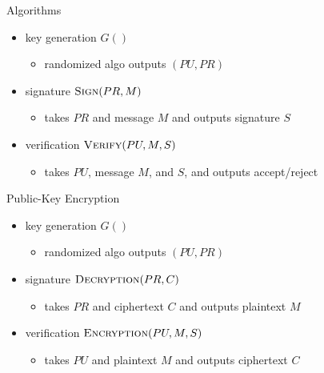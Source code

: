 \documentclass[draft]{article}
\begin{document}
\begin{multicols}{2}
    Algorithms
    \begin{itemize}[nosep]
        \item key generation $G()$
              \begin{itemize}[nosep]\item randomized algo outputs $(PU, PR)$\end{itemize}
        \item signature $\textproc{Sign}(PR, M)$
              \begin{itemize}[nosep]\item takes $PR$ and message $M$ and outputs signature $S$\end{itemize}
        \item verification $\textproc{Verify}(PU, M, S)$
              \begin{itemize}[nosep]\item takes $PU$, message $M$, and $S$, and outputs accept/reject\end{itemize}
    \end{itemize}
    Public-Key Encryption
    \begin{itemize}[nosep]
        \item key generation $G()$
              \begin{itemize}[nosep]\item randomized algo outputs $(PU, PR)$\end{itemize}
        \item signature $\textproc{Decryption}(PR, C)$
              \begin{itemize}[nosep]\item takes $PR$ and ciphertext $C$ and outputs plaintext $M$\end{itemize}
        \item verification $\textproc{Encryption}(PU, M, S)$
              \begin{itemize}[nosep]\item takes $PU$ and plaintext $M$ and outputs ciphertext $C$\end{itemize}
    \end{itemize}
\end{multicols}
\end{document}
